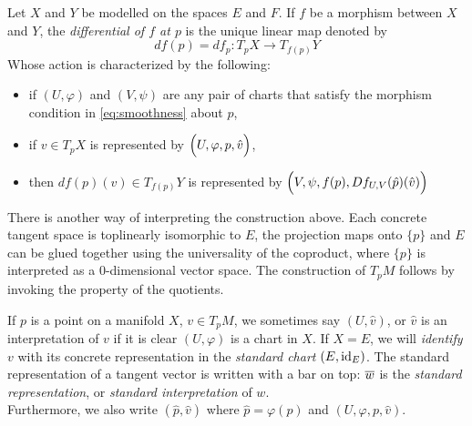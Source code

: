 \documentclass[../main-manifolds.tex]{subfiles}
\begin{document}
\begin{definition}\label{def:differential-of-a-morphism}
    Let $X$ and $Y$ be modelled on the spaces $E$ and $F$. If $f$ be a morphism between $X$ and $Y$, the \emph{differential of $f$ at $p$} is the unique linear map denoted by
    \begin{equation}\label{eq:differential-of-a-morphism}
        df(p)=df_p: T_p X\to T_{f(p)} Y
    \end{equation}
    Whose action is characterized by the following:
    \begin{itemize}
        \item if $(U,\varphi)$ and $(V,\psi)$ are any pair of charts that satisfy the morphism condition in \cref{eq:smoothness} about $p$,
        \item if $v\in T_p X$ is represented by $\qty\Big(U,\varphi,p, \hat{v})$,
        \item then $df(p)(v)\in T_{f(p)}Y$ is represented by $\qty\Big(V,\psi, f(p), Df_{U,V}(\hat{p})(\hat{v}))$
    \end{itemize}
\end{definition}
\begin{note}
    There is another way of interpreting the construction above. Each concrete tangent space is toplinearly isomorphic to $E$, the projection maps onto $\{p\}$ and $E$ can be glued together using the universality of the coproduct, where $\{p\}$ is interpreted as a $0$-dimensional vector space. The construction of $T_pM$ follows by invoking the property of the quotients.
\end{note}
\begin{remark}\label{rmk:omission-of-chart-in-concrete-rep}
    If $p$ is a point on a manifold $X$, $v\in T_p M$, we sometimes say $(U,\hat{v})$, or $\hat{v}$ is an interpretation of $v$ if it is clear $(U,\varphi)$ is a chart in $X$. If $X=E$, we will \emph{identify} $v$ with its concrete representation in the \emph{standard chart} $(E,\operatorname{id}_{E})$. The standard representation of a tangent vector is written with a bar on top: $\overline{w}$ is the \emph{standard representation}, or \emph{standard interpretation} of $w$.\\

    Furthermore, we also write $(\hat{p},\hat{v})$ where $\hat{p} = \varphi (p)$ and $(U,\varphi, p, \hat{v})$.
\end{remark}
\end{document}
